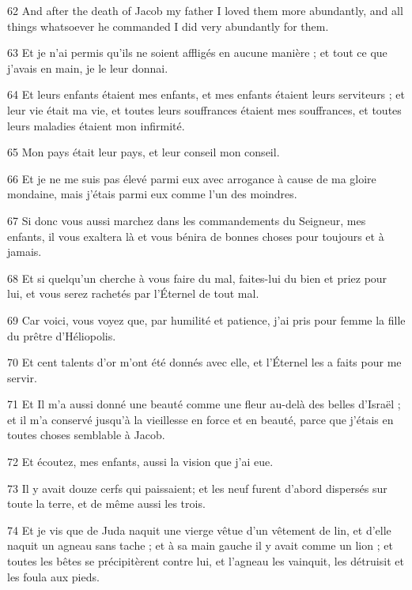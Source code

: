 \par 62 And after the death of Jacob my father I loved them more abundantly, and all things whatsoever he commanded I did very abundantly for them.

\par 63 Et je n'ai permis qu'ils ne soient affligés en aucune manière ; et tout ce que j'avais en main, je le leur donnai.

\par 64 Et leurs enfants étaient mes enfants, et mes enfants étaient leurs serviteurs ; et leur vie était ma vie, et toutes leurs souffrances étaient mes souffrances, et toutes leurs maladies étaient mon infirmité.

\par 65 Mon pays était leur pays, et leur conseil mon conseil.

\par 66 Et je ne me suis pas élevé parmi eux avec arrogance à cause de ma gloire mondaine, mais j'étais parmi eux comme l'un des moindres.

\par 67 Si donc vous aussi marchez dans les commandements du Seigneur, mes enfants, il vous exaltera là et vous bénira de bonnes choses pour toujours et à jamais.

\par 68 Et si quelqu'un cherche à vous faire du mal, faites-lui du bien et priez pour lui, et vous serez rachetés par l'Éternel de tout mal.

\par 69 Car voici, vous voyez que, par humilité et patience, j'ai pris pour femme la fille du prêtre d'Héliopolis.

\par 70 Et cent talents d'or m'ont été donnés avec elle, et l'Éternel les a faits pour me servir.

\par 71 Et Il m'a aussi donné une beauté comme une fleur au-delà des belles d'Israël ; et il m'a conservé jusqu'à la vieillesse en force et en beauté, parce que j'étais en toutes choses semblable à Jacob.

\par 72 Et écoutez, mes enfants, aussi la vision que j'ai eue.

\par 73 Il y avait douze cerfs qui paissaient; et les neuf furent d'abord dispersés sur toute la terre, et de même aussi les trois.

\par 74 Et je vis que de Juda naquit une vierge vêtue d'un vêtement de lin, et d'elle naquit un agneau sans tache ; et à sa main gauche il y avait comme un lion ; et toutes les bêtes se précipitèrent contre lui, et l'agneau les vainquit, les détruisit et les foula aux pieds.

